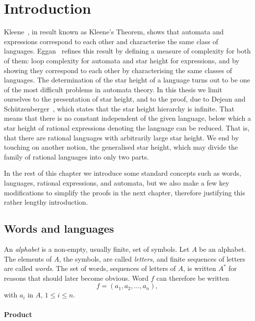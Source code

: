 \chapter{Introduction}

Kleene~\cite{Kleene56}, in result known as Kleene’s Theorem, shows that automata and expressions correspond to each other and characterise the same class of languages. Eggan~\cite{Eggan63} refines this result by defining a measure of complexity for both of them: loop complexity for automata and star height for expressions, and by showing they correspond to each other by characterising the same classes of languages. The determination of the star height of a language turns out to be one of the most difficult problems in automata theory. In this thesis we limit ourselves to the presentation of star height, and to the proof, due to Dejean and Schützenberger~\cite{DejeanSchutzenberger66}, which states that the star height hierarchy is infinite. That means that there is no constant independent of the given language, below which a star height of rational expressions denoting the language can be reduced. That is, that there are rational languages with arbitrarily large star height. We end by touching on another notion, the generalised star height, which may divide the family of rational languages into only two parts.

In the rest of this chapter we introduce some standard concepts such as words, languages, rational expressions, and automata, but we also make a few key modifications to simplify the proofs in the next chapter, therefore justifying this rather lengthy introduction.

\section{Words and languages}

An \emph{alphabet} is a non-empty, usually finite, set of symbols. Let $A$ be an alphabet. The elements of $A$, the symbols, are called \emph{letters}, and finite sequences of letters are called \emph{words}. The set of words, sequences of letters of $A$, is written $A^*$ for reasons that should later become obvious. Word $f$ can therefore be written
\[
    f = (a_1, a_2, \dotsc, a_n),
\]
with $a_i$ in $A$, $1 \leq i \leq n$.

\subsubsection*{Product}

